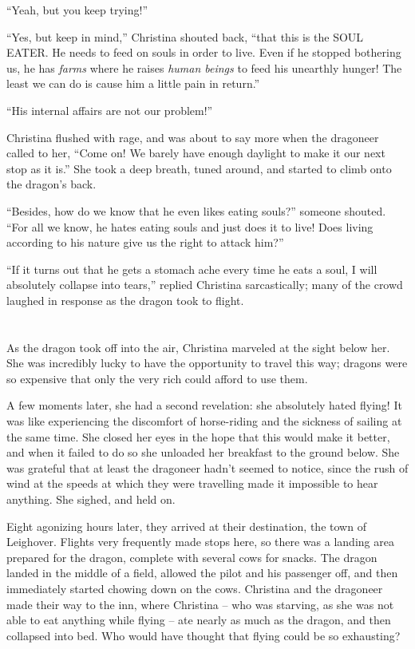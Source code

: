 \documentclass[showtrims,b6paper,draft,10pt]{memoir}
\begin{document}
``Yeah, but you keep trying!''

``Yes, but keep in mind,''  Christina shouted back, ``that this is the SOUL EATER.  He needs to feed on souls in order to live.  Even if he stopped bothering us, he has \emph{farms} where he raises \emph{human beings} to feed his unearthly hunger!  The least we can do is cause him a little pain in return.''

``His internal affairs are not our problem!''

Christina flushed with rage, and was about to say more when the dragoneer called to her, ``Come on!  We barely have enough daylight to make it our next stop as it is.''  She took a deep breath, tuned around, and started to climb onto the dragon's back.

``Besides, how do we know that he even likes eating souls?''  someone shouted.  ``For all we know, he hates eating souls and just does it to live!  Does living according to his nature give us the right to attack him?''

``If it turns out that he gets a stomach ache every time he eats a soul, I will absolutely collapse into tears,'' replied Christina sarcastically;  many of the crowd laughed in response as the dragon took to flight.

\timeskip
\chapter{}

As the dragon took off into the air, Christina marveled at the sight below her.  She was incredibly lucky to have the opportunity to travel this way;  dragons were so expensive that only the very rich could afford to use them.

A few moments later, she had a second revelation:  she absolutely hated flying!  It was like experiencing the discomfort of horse-riding and the sickness of sailing at the same time.  She closed her eyes in the hope that this would make it better, and when it failed to do so she unloaded her breakfast to the ground below.  She was grateful that at least the dragoneer hadn't seemed to notice, since the rush of wind at the speeds at which they were travelling made it impossible to hear anything.  She sighed, and held on.

Eight agonizing hours later, they arrived at their destination, the town of Leighover.  Flights very frequently made stops here, so there was a landing area prepared for the dragon, complete with several cows for snacks.  The dragon landed in the middle of a field, allowed the pilot and his passenger off, and then immediately started chowing down on the cows.  Christina and the dragoneer made their way to the inn, where Christina -- who was starving, as she was not able to eat anything while flying -- ate nearly as much as the dragon, and then collapsed into bed.  Who would have thought that flying could be so exhausting?
\end{document}
